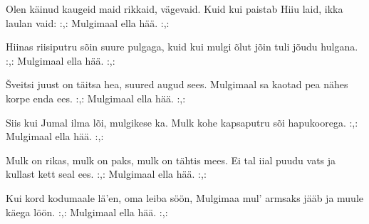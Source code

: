 Olen k\"ainud kaugeid maid
rikkaid, v\"agevaid.
Kuid kui paistab Hiiu laid,
ikka laulan vaid:
:,: Mulgimaal ella h\"a\"a. :,:

Hiinas riisiputru s\~oin
suure pulgaga,
kuid kui mulgi \~olut j\~oin
tuli j\~oudu hulgana.
:,: Mulgimaal ella h\"a\"a. :,:

\v{S}veitsi juust on t\"aitsa hea,
suured augud sees.
Mulgimaal sa kaotad pea
n\"ahes korpe enda ees.
:,: Mulgimaal ella h\"a\"a. :,:

Siis kui Jumal ilma l\~oi,
mulgikese ka.
Mulk kohe kapsaputru s\~oi
hapukoorega.
:,: Mulgimaal ella h\"a\"a. :,:

Mulk on rikas, mulk on paks,
mulk on t\"ahtis mees.
Ei tal iial puudu vats
ja kullast kett seal ees.
:,: Mulgimaal ella h\"a\"a. :,:

\clearpage Kui kord kodumaale l\"a'en,
oma leiba s\"o\"on,
Mulgimaa mul' armsaks j\"a\"ab
ja muule k\"aega l\"o\"on.
:,: Mulgimaal ella h\"a\"a. :,: